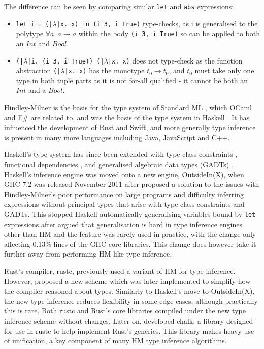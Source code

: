 \documentclass[a4paper,fleqn,oneside,12pt]{report}
\begin{document}
The difference can be seen by comparing similar \texttt{let} and \texttt{abs} expressions:
\begin{itemize}
  \item \texttt{let i = (|$\lambda$|x. x) in (i 3, i True)} type-checks, as i is generalised to the polytype $\forall a.\ a \rightarrow a$ within the body \texttt{(i 3, i True)} so can be applied to both an $Int$ and $Bool$.
  \item \texttt{(|$\lambda$|i. (i 3, i True)) (|$\lambda$|x. x)} does not type-check as the function abstraction \texttt{(|$\lambda$|x. x)} has the monotype $t_0 \rightarrow t_0$, and $t_0$ must take only one type in both tuple parts as it is not for-all qualified - it cannot be both an $Int$ and a $Bool$.
\end{itemize}

Hindley-Milner is the basis for the type system of Standard ML \citep{ref15}, which OCaml and F\# are related to, and was the basis of the type system in Haskell \citep{ref16}. It has influenced the development of Rust and Swift, and more generally type inference is present in many more languages including Java, JavaScript and C++.

Haskell's type system has since been extended with type-class constraints \citep{ref17}, functional dependencies \citep{ref18}, and generalised algebraic data types (GADTs) \citep{ref19}. Haskell’s inference engine was moved onto a new engine, OutsideIn(X), when GHC 7.2 was released November 2011 after \cite{ref20} proposed a solution to the issues with Hindley-Milner’s poor performance on large programs and difficulty inferring expressions without principal types that arise with type-class constraints and GADTs. This stopped Haskell automatically generalising variables bound by \texttt{let} expressions after \cite{ref21} argued that generalisation is hard in type inference engines other than HM and the feature was rarely used in practice, with the change only affecting 0.13\% lines of the GHC core libraries. This change does however take it further away from performing HM-like type inference.

Rust’s compiler, rustc, previously used a variant of HM for type inference. However, \cite{ref22} proposed a new scheme which was later implemented to simplify how the compiler reasoned about types. Similarly to Haskell’s move to OutsideIn(X), the new type inference reduces flexibility in some edge cases, although practically this is rare. Both rustc and Rust’s core libraries compiled under the new type inference scheme without changes. Later on, \cite{ref23} developed chalk, a library designed for use in rustc to help implement Rust’s generics. This library makes heavy use of unification, a key component of many HM type inference algorithms.
\end{document}
